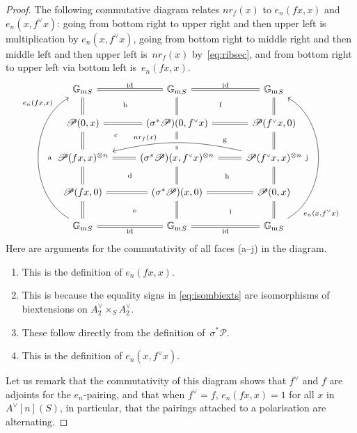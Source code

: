 \documentclass[JEP,XML,SOM,Unicode,NoFloatCountersInSection]{cedram}
\let\mathcal\mathscr
\let\oldvee\vee
\renewcommand{\vee}{{\scriptscriptstyle\oldvee}}
\theoremstyle{plain}
\theoremstyle{definition}
\numberwithin{equation}{subsection}
\renewcommand{\G}{\mathbb G}
\newcommand{\calP}{\mathcal{P}}
\newcommand{\Gm}{\G_{\mathrm{m}}}
\DeclareMathOperator{\id}{id}
\begin{document}
\begin{proof}
The following commutative diagram relates $nr_f(x)$ to $e_n(fx,x)$ and
$e_n(x,f^\vee x)$: going from bottom right to upper right and then
upper left is multiplication by $e_n(x,f^\vee x)$, going from bottom
right to middle right and then middle left and then upper left
is~$nr_f(x)$ by~\eqref{eq:ribsec}, and from bottom right to upper left
via bottom left is~$e_n(fx,x)$.
\begin{equation}\label{eq:ribsecweil}
\begin{tikzcd}
{\Gm}_S \arrow[r,equal, "\id"] \arrow[d,equal] \arrow[dr, phantom,
"\text{\scriptsize b}"]
& {\Gm}_S \arrow[r,equal,"\id"] \arrow[d,equal] \arrow[dr, phantom, "\text{\scriptsize f}"]
& {\Gm}_S \arrow[d,equal] \\
\calP(0,x) \arrow[d,equal] \arrow[r,equal] \arrow[dr, phantom, "\text{\scriptsize c}"
near start]
& (\sigma^*\calP)(0,f^\vee x) \arrow[d,equal] \arrow[r,equal]
\arrow[dr, phantom, "\text{\scriptsize g}"]
& \calP(f^\vee x,0) \arrow[d,equal] \\
\calP(fx,x)^{\otimes n} \arrow[d,equal] \arrow[r,equal]
\arrow[dr, phantom, "\text{\scriptsize d}"]
& (\sigma^*\calP)(x,f^\vee x)^{\otimes n} \arrow[d,equal]
\arrow[r,equal] \arrow[dr, phantom, "\text{\scriptsize h}"]
& \calP(f^\vee x,x)^{\otimes n} \arrow[d,equal]
\arrow[ll, bend right=13, crossing over, "{nr_f(x)}"' pos=0.65] \\
\calP(fx,0) \arrow[d,equal] \arrow[r,equal]
\arrow[dr, phantom, "\text{\scriptsize e}"]
& (\sigma^*\calP)(x,0) \arrow[d,equal] \arrow[r,equal]
\arrow[dr, phantom, "\text{\scriptsize i}"]
& \calP(0,x) \arrow[d,equal] \\
{\Gm}_S \arrow[r,equal,"\id"'] \arrow[uuuu,bend left=60,
"{e_n(fx,x)}", very near end]
\arrow[uuuu, phantom, bend left=45, "\text{\scriptsize a}"]
& {\Gm}_S \arrow[r,equal,"\id"']
& {\Gm}_S \arrow[uuuu,bend right=60,"{e_n(x,f^\vee x)}"', very near start]
\arrow[uuuu, phantom, bend right=45, "\text{\scriptsize j}"]
\end{tikzcd}
\end{equation}
Here are arguments for the commutativity of all faces (a--j) in the diagram.
\begin{enumerate}
\item[(a)] This is the definition of $e_n(fx,x)$.
\item[(b--e)] This is because the equality signs in
\eqref{eq:isombiexts} are isomorphisms of biextensions on
$A_2^\vee\times_S A_2^\vee$.
\item[(f--i)] These follow directly from the definition
of~$\sigma^*\calP$.
\item[(j)] This is the definition of $e_n(x,f^\vee x)$.
\end{enumerate}
Let us remark that the commutativity of this diagram shows that
$f^\vee$ and $f$ are adjoints for the $e_n$-pairing, and that when
$f^\vee=f$, $e_n(fx,x)=1$ for all $x$ in $A^\vee[n](S)$, in
particular, that the pairings attached to a polarisation are alternating.
\end{proof}
\end{document}

